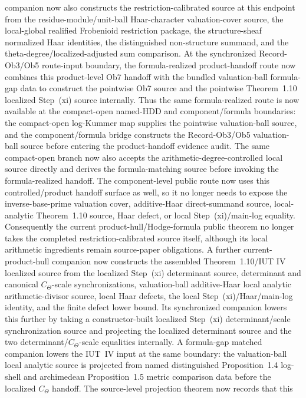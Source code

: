 \documentclass[11pt]{article}
\newcommand{\IUT}{IUT}
\theoremstyle{plain}
\theoremstyle{definition}
\theoremstyle{remark}
\begin{document}
companion now also constructs the restriction-calibrated source at this
endpoint from the residue-module/unit-ball Haar-character valuation-cover
source, the local-global realified Frobenioid restriction package, the
structure-sheaf normalized Haar identities, the distinguished non-structure
summand, and the theta-degree/localized-adjusted sum comparison.  At the
synchronized Record-Ob3/Ob5 route-input boundary, the formula-realized
product-handoff route now combines this product-level Ob7 handoff with the
bundled valuation-ball formula-gap data to construct the pointwise Ob7 source
and the pointwise Theorem~1.10 localized Step~(xi) source internally.  Thus the
same formula-realized route is now available at the compact-open named-HDD and
component/formula boundaries: the compact-open log-Kummer map supplies the
pointwise valuation-ball source, and the component/formula bridge constructs
the Record-Ob3/Ob5 valuation-ball source before entering the product-handoff
evidence audit.  The same compact-open branch now also accepts the
arithmetic-degree-controlled local source directly and derives the
formula-matching source before invoking the formula-realized handoff.
The component-level public route now uses this controlled/product handoff
surface as well, so it no longer needs to expose the inverse-base-prime
valuation cover, additive-Haar direct-summand source, local-analytic
Theorem~1.10 source, Haar defect, or local Step~(xi)/main-log equality.
Consequently the
current product-hull/Hodge-formula public theorem no longer takes the completed
restriction-calibrated source itself, although its local arithmetic ingredients
remain source-paper obligations.  A further current-product-hull companion now
constructs the assembled Theorem~1.10/\IUT{} IV localized source from the
localized Step~(xi) determinant source, determinant and canonical
\(C_\Theta\)-scale synchronizations, valuation-ball additive-Haar local
analytic arithmetic-divisor source, local Haar defects, the local
Step~(xi)/Haar/main-log identity, and the finite defect lower bound.  Its
synchronized companion lowers this further by taking a constructor-built
localized Step~(xi) determinant/scale synchronization source and projecting the
localized determinant source and the two determinant/\(C_\Theta\)-scale
equalities internally.  A formula-gap matched companion lowers the IUT~IV
input at the same boundary: the valuation-ball local analytic source is
projected from named distinguished Proposition~1.4 log-shell and archimedean
Proposition~1.5 metric comparison data before the localized \(C_\Theta\)
handoff.  The source-level projection theorem now records that this
\end{document}
